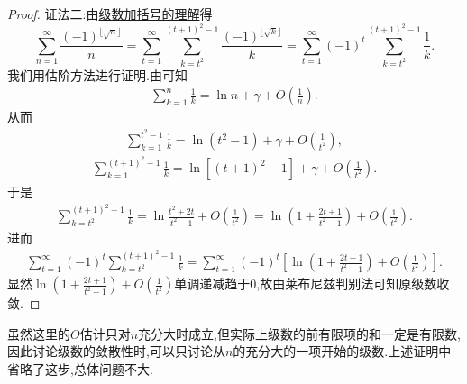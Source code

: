 \documentclass[../../main.tex]{subfiles}
\begin{document}
\begin{proof}
{\color{blue}证法二:}由\hyperref[theorem:级数加括号的理解]{级数加括号的理解}得
\[
\sum_{n=1}^{\infty}{\frac{(-1)^{\lfloor \sqrt{n} \rfloor}}{n}}=\sum_{t=1}^{\infty}{\sum_{k=t^2}^{(t+1)^2-1}{\frac{\left( -1 \right) ^{\lfloor \sqrt{k} \rfloor}}{k}}}=\sum_{t=1}^{\infty}{\left( -1 \right) ^t\sum_{k=t^2}^{(t+1)^2-1}{\frac{1}{k}}}.
\]
我们用估阶方法进行证明.由可知
\begin{align*}
\sum_{k=1}^n{\frac{1}{k}}=\ln n+\gamma +O\left( \frac{1}{n} \right) .
\end{align*}
从而
\begin{align*}
\sum_{k=1}^{t^2-1}{\frac{1}{k}}=\ln \left( t^2-1 \right) +\gamma +O\left( \frac{1}{t^2} \right) ,
\end{align*}
\begin{align*}
\sum_{k=1}^{\left( t+1 \right) ^2-1}{\frac{1}{k}}=\ln \left[ \left( t+1 \right) ^2-1 \right] +\gamma +O\left( \frac{1}{t^2} \right) .
\end{align*}
于是
\begin{align*}
\sum_{k=t^2}^{\left( t+1 \right) ^2-1}{\frac{1}{k}}=\ln \frac{t^2+2t}{t^2-1}+O\left( \frac{1}{t^2} \right) =\ln \left( 1+\frac{2t+1}{t^2-1} \right) +O\left( \frac{1}{t^2} \right) .
\end{align*}
进而
\begin{align*}
\sum_{t=1}^{\infty}{\left( -1 \right) ^t\sum_{k=t^2}^{(t+1)^2-1}{\frac{1}{k}}}=\sum_{t=1}^{\infty}{\left( -1 \right) ^t\left[ \ln \left( 1+\frac{2t+1}{t^2-1} \right) +O\left( \frac{1}{t^2} \right) \right]}.
\end{align*}
显然$\ln \left( 1+\frac{2t+1}{t^2-1} \right) +O\left( \frac{1}{t^2} \right)$单调递减趋于$0$,故由莱布尼兹判别法可知原级数收敛.

\end{proof}
\begin{remark}
虽然这里的$O$估计只对$n$充分大时成立,但实际上级数的前有限项的和一定是有限数,因此讨论级数的敛散性时,可以只讨论从$n$的充分大的一项开始的级数.上述证明中省略了这步,总体问题不大.
\end{remark}
\end{document}
